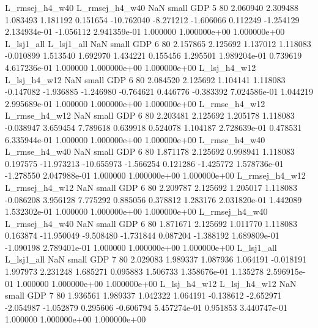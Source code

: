 L_rmsej_h4_w40 L_rmsej_h4_w40                   NaN      small      GDP                 5 80 2.060940       2.309488 1.083493       1.181192    0.151654    -10.762040     -8.271212    -1.606066       0.112249 -1.254129 2.134934e-01    -1.056112   2.941359e-01            1.000000    1.000000e+00        1.000000e+00
    L_lsj1_all     L_lsj1_all                   NaN      small      GDP                 6 80 2.157865       2.125692 1.137012       1.118083   -0.010899      1.513540      1.692970     1.434221       0.155456  1.295501 1.989204e-01     0.739619   4.617236e-01            1.000000    1.000000e+00        1.000000e+00
  L_lsj_h4_w12   L_lsj_h4_w12                   NaN      small      GDP                 6 80 2.084520       2.125692 1.104141       1.118083   -0.147082     -1.936885     -1.246980    -0.764621       0.446776 -0.383392 7.024586e-01     1.044219   2.995689e-01            1.000000    1.000000e+00        1.000000e+00
 L_rmse_h4_w12  L_rmse_h4_w12                   NaN      small      GDP                 6 80 2.203481       2.125692 1.205178       1.118083   -0.038947      3.659454      7.789618     0.639918       0.524078  1.104187 2.728639e-01     0.478531   6.335944e-01            1.000000    1.000000e+00        1.000000e+00
 L_rmse_h4_w40  L_rmse_h4_w40                   NaN      small      GDP                 6 80 1.871178       2.125692 0.998941       1.118083    0.197575    -11.973213    -10.655973    -1.566254       0.121286 -1.425772 1.578736e-01    -1.278550   2.047988e-01            1.000000    1.000000e+00        1.000000e+00
L_rmsej_h4_w12 L_rmsej_h4_w12                   NaN      small      GDP                 6 80 2.209787       2.125692 1.205017       1.118083   -0.086208      3.956128      7.775292     0.885056       0.378812  1.283176 2.031820e-01     1.442089   1.532302e-01            1.000000    1.000000e+00        1.000000e+00
L_rmsej_h4_w40 L_rmsej_h4_w40                   NaN      small      GDP                 6 80 1.871671       2.125692 1.011770       1.118083    0.163874    -11.950049     -9.508480    -1.731844       0.087204 -1.388192 1.689809e-01    -1.090198   2.789401e-01            1.000000    1.000000e+00        1.000000e+00
    L_lsj1_all     L_lsj1_all                   NaN      small      GDP                 7 80 2.029083       1.989337 1.087936       1.064191   -0.018191      1.997973      2.231248     1.685271       0.095883  1.506733 1.358676e-01     1.135278   2.596915e-01            1.000000    1.000000e+00        1.000000e+00
  L_lsj_h4_w12   L_lsj_h4_w12                   NaN      small      GDP                 7 80 1.936561       1.989337 1.042322       1.064191   -0.138612     -2.652971     -2.054987    -1.052879       0.295606 -0.606794 5.457274e-01     0.951853   3.440747e-01            1.000000    1.000000e+00        1.000000e+00
